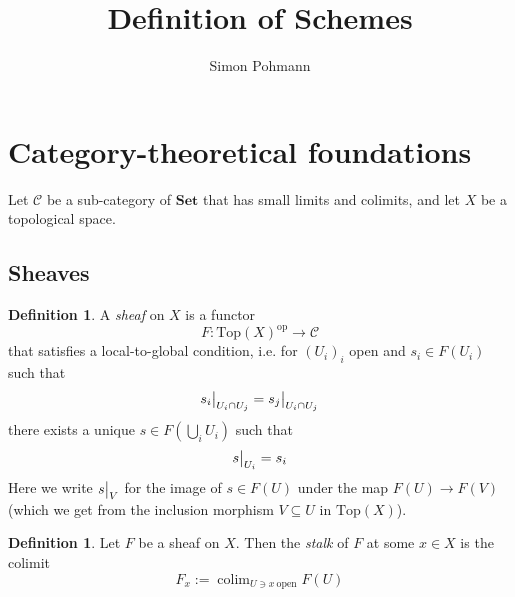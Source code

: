 \documentclass{scrartcl}
\title{Definition of Schemes}
\author{Simon Pohmann}
\newcommand{\Set}{\mathrm{\textbf{Set}}}
\newcommand{\Top}{\mathrm{Top}}
\DeclareMathOperator*{\colim}{colim}
\newcommand\restr[2]{{
    \left.\kern-\nulldelimiterspace
    #1
    \vphantom{\big|}
    \right|_{#2}
}}
\theoremstyle{definition}
\newtheorem{definition}[prop]{Definition}
\begin{document}
\maketitle
\tableofcontents

\section{Category-theoretical foundations}
Let $\mathcal{C}$ be a sub-category of $\Set$ that has small limits and colimits, and let $X$ be a topological space.

\subsection{Sheaves}
\begin{definition}
    A \emph{sheaf} on $X$ is a functor
    \begin{equation*}
        F: \Top(X)^{\mathrm{op}} \to \mathcal{C}
    \end{equation*}
    that satisfies a local-to-global condition, i.e. for $(U_i)_i$ open and $s_i \in F(U_i)$ such that
    \begin{equation*}
        \restr{s_i}{U_i \cap U_j} = \restr{s_j}{U_i \cap U_j}
    \end{equation*}
    there exists a unique $s \in F(\bigcup_i U_i)$ such that
    \begin{equation*}
        \restr{s}{U_i} = s_i
    \end{equation*}
    Here we write $\restr{s}{V}$ for the image of $s \in F(U)$ under the map $F(U) \to F(V)$ (which we get from the inclusion morphism $V \subseteq U$ in $\Top(X)$).
\end{definition}
\begin{definition}
    Let $F$ be a sheaf on $X$. Then the \emph{stalk} of $F$ at some $x \in X$ is the colimit
    \begin{equation*}
        F_x := \colim_{U \ni x \ \text{open}} F(U)
    \end{equation*}
\end{definition}
\end{document}
